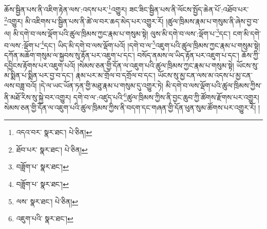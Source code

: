 ཆོས་སྦྱིན་པས་ནི་འཇིག་རྟེན་ལས་:འདས་པར་\footnote{འདའ་བར་  སྣར་ཐང་།  པེ་ཅིན། }འགྱུར། ཟང་ཟིང་སྦྱིན་པས་ནི་ལོངས་སྤྱོད་ཆེན་པོ་:འཐོབ་པར་\footnote{ཐོབ་པར་  སྣར་ཐང་།  པེ་ཅིན། }འགྱུར། མི་འཇིགས་པ་སྦྱིན་པས་ནི་ཚེ་ལ་བར་ཆད་མེད་པར་འགྱུར་རོ། །ཚུལ་ཁྲིམས་རྣམ་པ་གསུམ་ནི་ཞེས་བྱ་བ་ལ། མི་དགེ་བ་ལས་ལྡོག་པའི་ཚུལ་ཁྲིམས་ཀྱང་རྣམ་པ་གསུམ་སྟེ། ལུས་མི་དགེ་བ་ལས་:ལྡོག་པ་\footnote{བཟློག་པ་  སྣར་ཐང་། }དང་། ངག་མི་དགེ་བ་ལས་:ལྡོག་པ་\footnote{བཟློག་པ་  སྣར་ཐང་། }དང་། ཡིད་མི་དགེ་བ་ལས་ལྡོག་པའོ། །དགེ་བ་ལ་\footnote{ལས་  སྣར་ཐང་།  པེ་ཅིན། }འཇུག་པའི་ཚུལ་ཁྲིམས་ཀྱང་རྣམ་པ་གསུམ་སྟེ། དཀོན་མཆོག་གསུམ་ལ་སྐྱབས་སུ་རྟོན་པར་འཇུག་པ་དང་། བསོད་ནམས་ལ་ཡིད་རྟོན་པར་འཇུག་པ་དང་། ཆོས་ཀྱི་དབྱིངས་རྟོགས་པར་འཇུག་པའོ། །སེམས་ཅན་གྱི་དོན་ལ་འཇུག་པའི་ཚུལ་ཁྲིམས་ཀྱང་རྣམ་པ་གསུམ་སྟེ། ཡོངས་སུ་མ་སྨིན་པ་སྨིན་པར་བྱ་བ་དང་། རྣམ་པར་མ་གྲོལ་བ་དགྲོལ་བ་དང་། ཡོངས་སུ་མྱ་ངན་ལས་མ་འདས་པ་མྱ་ངན་ལས་བཟླ་བའོ། །དེ་ལ་ཡང་ཡོན་ཏན་གྱི་མཐུ་རྣམ་པ་གསུམ་དུ་འགྱུར་ཏེ། མི་དགེ་བ་ལས་ལྡོག་པའི་ཚུལ་ཁྲིམས་ཀྱིས་ནི་མཐོ་རིས་སུ་སྐྱེ་བར་འགྱུར། དགེ་བ་ལ་:འཛུད་པའི་\footnote{འཇུག་པའི་  སྣར་ཐང་། }ཚུལ་ཁྲིམས་ཀྱིས་ནི་བྱང་ཆུབ་ཀྱི་ཚོགས་རྫོགས་པར་འགྱུར། སེམས་ཅན་གྱི་དོན་ལ་འཇུག་པའི་ཚུལ་ཁྲིམས་ཀྱིས་ནི་བདག་དང་གཞན་གྱི་དོན་ཕུན་སུམ་ཚོགས་པར་འགྱུར་རོ། །
